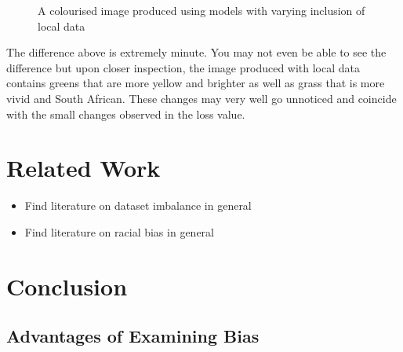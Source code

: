 \documentclass[conference]{IEEEtran}
\begin{document}
\begin{figure}[h!]
    \centering
    \qquad
    \caption{A colourised image produced using models with varying inclusion of local data}%
    \label{fig:inclusion_compare}
\end{figure}

The difference above is extremely minute. You may not even be able to see the difference but upon closer inspection, the image produced with local data contains greens that are more yellow and brighter as well as grass that is more vivid and South African. These changes may very well go unnoticed and coincide with the small changes observed in the loss value.

\section{Related Work}

\begin{itemize}
    \item Find literature on dataset imbalance in general
    \item Find literature on racial bias in general
\end{itemize}

\section{Conclusion}

%
%
%
\subsection{Advantages of Examining Bias}
\end{document}
